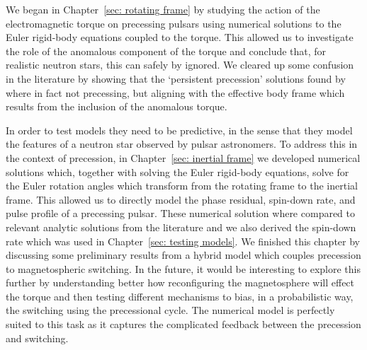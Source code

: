 \documentclass[twoside, 11pt]{thesis}
\begin{document}
We began in Chapter~\ref{sec: rotating frame} by studying the action of the
electromagnetic torque on precessing pulsars using numerical solutions to the
Euler rigid-body equations coupled to the \citet{Deutsch1955} torque. This allowed
us to investigate the role of the anomalous component of the torque and conclude
that, for realistic neutron stars, this can safely by ignored. We cleared up some
confusion in the literature by showing that the `persistent precession' solutions
found by \citet{Melatos2000} where in fact not precessing, but aligning with
the effective body frame which results from the inclusion of the anomalous torque.

In order to test models they need to be predictive, in the sense that they
model the features of a neutron star observed by pulsar astronomers. To address
this in the context of precession, in Chapter~\ref{sec: inertial frame} we
developed numerical solutions which, together with solving the Euler rigid-body
equations, solve for the Euler rotation angles which transform from the
rotating frame to the inertial frame. This allowed us to directly model the
phase residual, spin-down rate, and pulse profile of a precessing pulsar.
These numerical solution where compared to relevant analytic solutions from the
literature and we also derived the spin-down rate which was used in
Chapter~\ref{sec: testing models}. We finished this chapter by discussing some
preliminary results from a hybrid model which couples precession to
magnetospheric switching. In the future, it would be interesting to explore
this further by understanding better how reconfiguring the magnetosphere will
effect the \citet{Deutsch1955} torque and then testing different mechanisms to
bias, in a probabilistic way, the switching using the precessional cycle. The
numerical model is perfectly suited to this task as it captures the complicated
feedback between the precession and switching.
\end{document}
